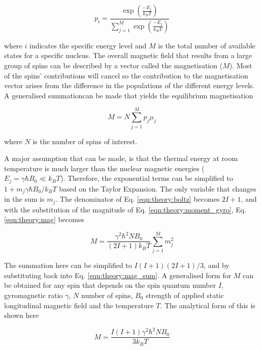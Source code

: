 \begin{equation}
    p_i = \frac{\exp\left(\frac{-E_i}{k_BT}\right)}{\displaystyle \sum_{j = 1}^{M}\exp\left(\frac{-E_j}{k_BT}\right)}
    \label{eqn:theory:boltz}
\end{equation}

\noindent where $i$ indicates the specific energy level and $M$ is the total number of available states for a specific nucleus. The overall magnetic field that results from a large group of spins can be described by a vector called the magnetisation ($M$). Most of the spins' contributions will cancel so the contribution to the magnetisation vector arises from the difference in the populations of the different energy levels. A generalised summationcan be made that yields the equilibrium magnetisation 

\begin{equation}
    M = N\sum_{j = 1}^{M}p_j\mu_j
    \label{eqn:theory:mag}
\end{equation}

\noindent where $N$ is the number of spins of interest. 

A major assumption that can be made, is that the thermal energy at room temperature is much larger than the nuclear magnetic energies ($E_j = \gamma \hbar B_0\ll k_BT$). Therefore, the exponential terms can be simplified to $1 +m_j\gamma \hbar B_0/k_BT$ based on the Taylor Expansion. The only variable that changes in the sum is $m_j$. The denominator of Eq. \ref{eqn:theory:boltz} becomes $2I+1$, and with the substitution of the magnitude of Eq. \ref{eqn:theory:moment_gyro}, Eq. \ref{eqn:theory:mag} becomes

\begin{equation}
    M = \frac{\gamma^2\hbar^2NB_0}{(2I+1)k_BT}\sum_{j=1}^{M}m_j^2
    \label{eqn:theory:mag_sum}
\end{equation}

\noindent The summation here can be simplified to $I(I+1)(2I+1)/3$, and by substituting back into Eq. \ref{eqn:theory:mag_sum}. A generalised form for $M$ can be obtained for any spin that depends on the spin quantum number $I$, gyromagnetic ratio $\gamma$, $N$ number of spins, $B_0$ strength of applied static longitudinal magnetic field and the temperature $T$. The analytical form of this is shown here

\begin{equation}
    M = \frac{I(I+1)\gamma^2 \hbar^2 N B_0}{3k_BT}
    \label{eqn:theory:mag_s}
\end{equation}

